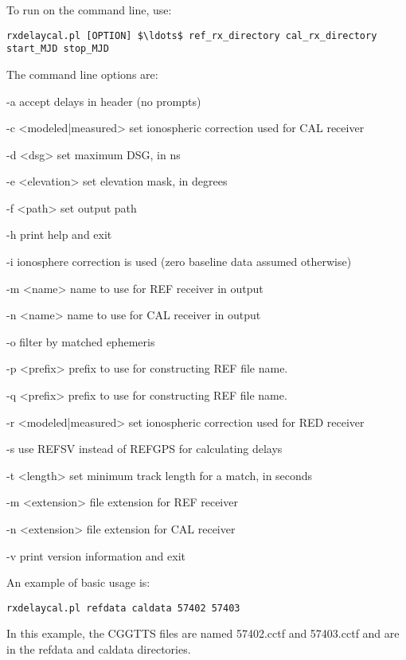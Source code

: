To run  on the command line, use:
\begin{lstlisting}[mathescape=true]
rxdelaycal.pl [OPTION] $\ldots$ ref_rx_directory cal_rx_directory start_MJD stop_MJD
\end{lstlisting}
The command line options are:
\begin{description*}
	\item[-a]	accept delays in header (no prompts)
	\item[-c  \textless modeled|measured\textgreater] set ionospheric correction used for CAL receiver
	\item[-d  \textless dsg\textgreater] set maximum DSG, in ns
	\item[-e  \textless elevation\textgreater] set elevation mask, in degrees
	\item[-f  \textless path\textgreater] set output path
	\item[-h]	print help and exit
	\item[-i] ionosphere correction is used (zero baseline data assumed otherwise)
	\item[-m  \textless name\textgreater] name to use for REF receiver in output
	\item[-n  \textless name\textgreater] name to use for CAL receiver in output
	\item[-o] filter by matched ephemeris
	\item[-p \textless prefix\textgreater] prefix to use for constructing REF file name.
	\item[-q \textless prefix\textgreater] prefix to use for constructing REF file name.
	\item[-r  \textless modeled|measured\textgreater] set ionospheric correction used for RED receiver
	\item[-s]  use REFSV instead of REFGPS for calculating delays
	\item[-t  \textless length\textgreater] set minimum track length for a match, in seconds
	\item[-m  \textless extension\textgreater] file extension for REF receiver
	\item[-n  \textless extension\textgreater] file extension for CAL receiver
	\item[-v]	print version information and exit
\end{description*}

An example of basic usage is:
\begin{lstlisting}
rxdelaycal.pl refdata caldata 57402 57403
\end{lstlisting}
In this example, the CGGTTS files are named 57402.cctf and 57403.cctf and are in the refdata and caldata directories.

